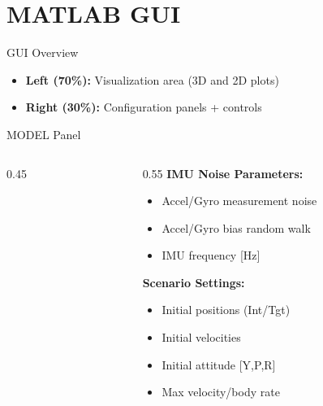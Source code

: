 \documentclass{beamer}
\begin{document}
\section{MATLAB GUI}

\begin{frame}{GUI Overview}
\begin{center}
\end{center}

\begin{itemize}
    \item \textbf{Left (70\%):} Visualization area (3D and 2D plots)
    \item \textbf{Right (30\%):} Configuration panels + controls
\end{itemize}
\end{frame}

\begin{frame}{MODEL Panel}
\begin{columns}
\begin{column}{0.45\textwidth}
\end{column}

\begin{column}{0.55\textwidth}
\textbf{IMU Noise Parameters:}
\begin{itemize}
    \item Accel/Gyro measurement noise
    \item Accel/Gyro bias random walk
    \item IMU frequency [Hz]
\end{itemize}

\vspace{0.5cm}
\textbf{Scenario Settings:}
\begin{itemize}
    \item Initial positions (Int/Tgt)
    \item Initial velocities
    \item Initial attitude [Y,P,R]
    \item Max velocity/body rate
\end{itemize}
\end{column}
\end{columns}
\end{frame}
\end{document}
